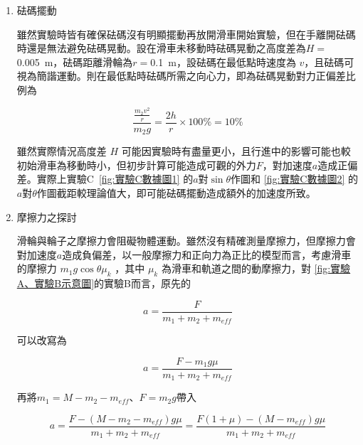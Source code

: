 \documentclass[11pt,a4paper]{article}
\theoremstyle{definition}
\begin{document}
            \begin{enumerate}

                \item 砝碼擺動
                \par
                雖然實驗時皆有確保砝碼沒有明顯擺動再放開滑車開始實驗，但在手離開砝碼時還是無法避免砝碼晃動。設在滑車未移動時砝碼晃動之高度差為$H = $\SI{0.005}{\meter}，砝碼距離滑輪為$r = $\SI{0.1}{\meter}，設砝碼在最低點時速度為 $v$，且砝碼可視為簡諧運動。則在最低點時砝碼所需之向心力，即為砝碼晃動對力正偏差比例為

                \begin{equation}
                    \frac{\frac{m_2v^2}{r}}{m_2g} = \frac{2h}{r} \times 100\% = 10\%
                \end{equation}

                雖然實際情況高度差 $H$ 可能因實驗時有盡量更小，且行進中的影響可能也較初始滑車為移動時小，但初步計算可能造成可觀的外力$F$，對加速度$a$造成正偏差。實際上實驗C\ \autoref{fig:實驗C數據圖1} 的$a$對$\sin\theta$作圖和 \autoref{fig:實驗C數據圖2} 的$a$對$\theta$作圖截距較理論值大，即可能砝碼擺動造成額外的加速度所致。

                \item 摩擦力之探討
                \par 滑輪與輪子之摩擦力會阻礙物體運動。雖然沒有精確測量摩擦力，但摩擦力會對加速度$a$造成負偏差，以一般摩擦力和正向力為正比的模型而言，考慮滑車的摩擦力 $m_1 g \cos\theta \mu_k$ ，其中 $\mu_k$ 為滑車和軌道之間的動摩擦力，對 \autoref{fig:實驗A、實驗B示意圖}的實驗B而言，原先的
                
                \begin{equation}
                    a = \frac{F}{m_1 + m_2 + m_{eff}}
                \end{equation}

                可以改寫為

                \begin{equation}
                    a = \frac{F - m_1g\mu
                    }{m_1 + m_2 + m_{eff}}
                \end{equation}

                再將$m_1 = M - m_2 - m_{eff}$、$F = m_2g$帶入

                \begin{equation}
                    a = \frac{F - (M - m_2 - m_{eff})g\mu
                    }{m_1 + m_2 + m_{eff}} = \frac{F(1 + \mu) - (M - m_{eff})g\mu
                    }{m_1 + m_2 + m_{eff}}
                \end{equation}
                


\end{enumerate}
\end{document}
